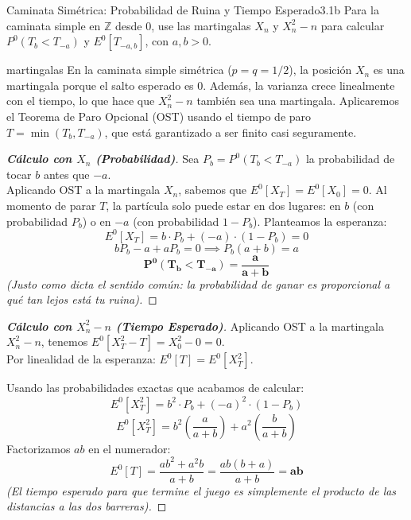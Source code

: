 \documentclass[10pt,a4paper]{article}
\begin{document}
\vspace{5mm}

\begin{ejercicio}{Caminata Simétrica: Probabilidad de Ruina y Tiempo Esperado}{3.1b}
    Para la caminata simple en $\mathbb{Z}$ desde 0, use las martingalas $X_n$ y $X_n^2 - n$ para calcular $P^0(T_b < T_{-a})$ y $E^0[T_{-a,b}]$, con $a, b > 0$.
\end{ejercicio}

\vspace{2mm}

\begin{nota}{martingalas}
    En la caminata simple simétrica ($p=q=1/2$), la posición $X_n$ es una martingala porque el salto esperado es 0. 
    Además, la varianza crece linealmente con el tiempo, lo que hace que $X_n^2 - n$ también sea una martingala. Aplicaremos el Teorema de Paro Opcional (OST) usando el tiempo de paro $T = \min(T_b, T_{-a})$, que está garantizado a ser finito casi seguramente.
\end{nota}

\begin{proof}[\textbf{Cálculo con $X_n$ (Probabilidad)}]
    Sea $P_b = P^0(T_b < T_{-a})$ la probabilidad de tocar $b$ antes que $-a$. \\
    Aplicando OST a la martingala $X_n$, sabemos que $E^0[X_T] = E^0[X_0] = 0$.
    Al momento de parar $T$, la partícula solo puede estar en dos lugares: en $b$ (con probabilidad $P_b$) o en $-a$ (con probabilidad $1 - P_b$). Planteamos la esperanza:
    \[ E^0[X_T] = b \cdot P_b + (-a) \cdot (1 - P_b) = 0 \]
    \[ b P_b - a + a P_b = 0 \implies P_b(a+b) = a \]
    \[ \mathbf{P^0(T_b < T_{-a}) = \frac{a}{a+b}} \]
    \textit{(Justo como dicta el sentido común: la probabilidad de ganar es proporcional a qué tan lejos está tu ruina).}
\end{proof}

\begin{proof}[\textbf{Cálculo con $X_n^2 - n$ (Tiempo Esperado)}]
    Aplicando OST a la martingala $X_n^2 - n$, tenemos $E^0[X_T^2 - T] = X_0^2 - 0 = 0$. \\
    Por linealidad de la esperanza: $E^0[T] = E^0[X_T^2]$.
    
    Usando las probabilidades exactas que acabamos de calcular:
    \[ E^0[X_T^2] = b^2 \cdot P_b + (-a)^2 \cdot (1 - P_b) \]
    \[ E^0[X_T^2] = b^2 \left( \frac{a}{a+b} \right) + a^2 \left( \frac{b}{a+b} \right) \]
    Factorizamos $ab$ en el numerador:
    \[ E^0[T] = \frac{ab^2 + a^2b}{a+b} = \frac{ab(b + a)}{a+b} = \mathbf{ab} \]
    \textit{(El tiempo esperado para que termine el juego es simplemente el producto de las distancias a las dos barreras).}
\end{proof}
\end{document}
